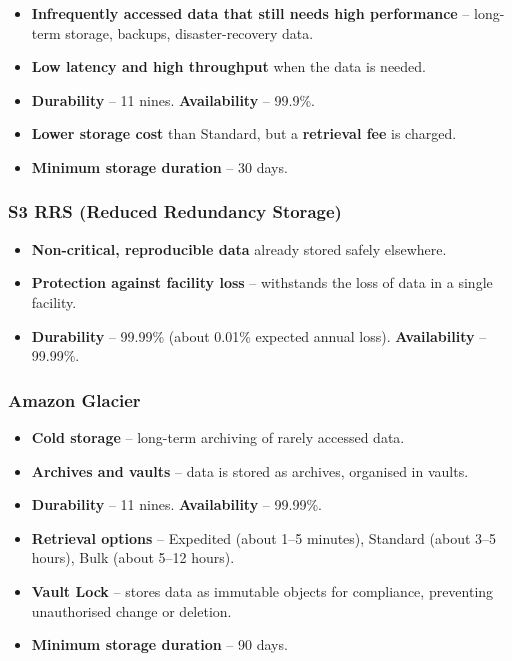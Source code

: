 \documentclass[11pt,a4paper]{article}
\begin{document}
\begin{itemize}\itemsep2pt
  \item \textbf{Infrequently accessed data that still needs high performance} -- long-term
        storage, backups, disaster-recovery data.
  \item \textbf{Low latency and high throughput} when the data is needed.
  \item \textbf{Durability} -- 11 nines. \textbf{Availability} -- 99.9\%.
  \item \textbf{Lower storage cost} than Standard, but a \textbf{retrieval fee} is charged.
  \item \textbf{Minimum storage duration} -- 30 days.
\end{itemize}

\subsubsection{S3 RRS (Reduced Redundancy Storage)}

\begin{itemize}\itemsep2pt
  \item \textbf{Non-critical, reproducible data} already stored safely elsewhere.
  \item \textbf{Protection against facility loss} -- withstands the loss of data in a single
        facility.
  \item \textbf{Durability} -- 99.99\% (about 0.01\% expected annual loss).
        \textbf{Availability} -- 99.99\%.
\end{itemize}

\subsubsection{Amazon Glacier}

\begin{itemize}\itemsep2pt
  \item \textbf{Cold storage} -- long-term archiving of rarely accessed data.
  \item \textbf{Archives and vaults} -- data is stored as archives, organised in vaults.
  \item \textbf{Durability} -- 11 nines. \textbf{Availability} -- 99.99\%.
  \item \textbf{Retrieval options} -- Expedited (about 1--5 minutes), Standard (about 3--5
        hours), Bulk (about 5--12 hours).
  \item \textbf{Vault Lock} -- stores data as immutable objects for compliance, preventing
        unauthorised change or deletion.
  \item \textbf{Minimum storage duration} -- 90 days.
\end{itemize}
\end{document}
